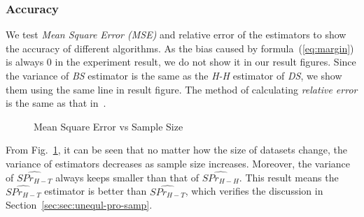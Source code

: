 \documentclass[runningheads,a4paper]{llncs}
\begin{document}
\vspace{-0.2cm}
\subsubsection{Accuracy}
\label{sec:exp:estim:var}

We test \emph{Mean Square Error (MSE)} and relative error of the estimators to show the accuracy of different algorithms. As the bias caused by formula~(\ref{eq:margin}) is always 0 in the experiment result, we do not show it in our result figures. Since the variance of \emph{BS} estimator is the same as the \emph{H-H} estimator of \emph{DS}, we show them using the same line in result figure. The method of calculating \emph{relative error} is the same as that in~\cite{jin2011distance}.

\begin{figure}[htbp]
\vspace{-0.7cm}
  \centering
\vspace{-0.3cm}
  \caption{Mean Square Error vs Sample Size}
  \label{fig:mse}
\vspace{-0.6cm}
\end{figure}

From Fig.~\ref{fig:mse}, it can be seen that no matter how the size of datasets change, the variance of estimators decreases as sample size increases. Moreover, the variance of $\widehat{SPr_{H-T}}$ always keeps smaller than that of $\widehat{SPr_{H-H}}$. This result means the $\widehat{SPr_{H-T}}$ estimator is better than $\widehat{SPr_{H-T}}$, which verifies the discussion in Section~\ref{sec:sec:unequl-pro-samp}.
\end{document}
